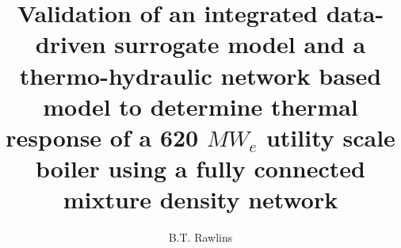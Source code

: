 \documentclass[a4paper,fleqn]{cas-sc}
\begin{document}
\let\WriteBookmarks\relax
\def\floatpagepagefraction{1}
\def\textpagefraction{.001}

\shorttitle{}    

%
%
%
%
%
%

\title [mode = title]{Validation of an integrated data-driven surrogate model and a thermo-hydraulic network based model to determine thermal response of a 620 $MW_e$ utility scale boiler using a fully connected mixture density network}  



%

\author[1]{B.T. Rawlins}

\cormark[1]

\end{document}
